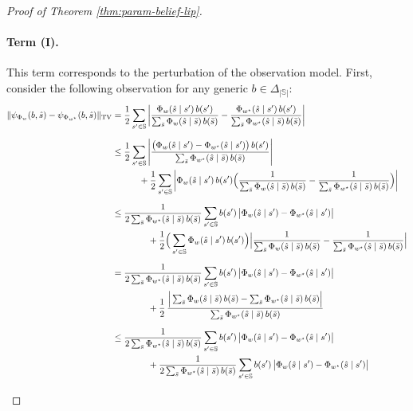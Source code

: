 \documentclass[10pt]{article} %
\theoremstyle{plain}
\theoremstyle{definition}
\theoremstyle{remark}
\newcommand{\bS}{\mathbb{S}}
\begin{document}
\begin{proof}[Proof of Theorem \ref{thm:param-belief-lip}]
\medskip
\noindent
\paragraph{Term (I).} This term corresponds to the perturbation of the observation model. First, consider the following observation for any generic \(b\in\Delta_{|\bS|}\):
\begin{align}\label{eq:bayes-op-param-perturb}
\|\psi_{\Phi_w}(b,\hat{s}) - \psi_{\Phi_{w^\star}}(b,\hat{s})\|_{\mathrm{TV}}
&=\frac12\sum_{s'\in\bS}\left|
\frac{\Phi_w(\hat s\mid s')\,b(s')}{\sum_{\bar s}\Phi_w(\hat s\mid \bar s)\,b(\bar s)}
-\frac{\Phi_{w^\star}(\hat s\mid s')\,b(s')}{\sum_{\bar s}\Phi_{w^\star}(\hat s\mid \bar s)\,b(\bar s)}
\right|\notag\\[6pt]
&\le \frac12\sum_{s'\in\bS}\left|
\frac{\bigl(\Phi_w(\hat s\mid s')-\Phi_{w^\star}(\hat s\mid s')\bigr)\,b(s')}{\sum_{\bar s}\Phi_{w^\star}(\hat s\mid \bar s)\,b(\bar s)}
\right|\notag\\
&\qquad\quad+\frac12\sum_{s'\in\bS}\left|
\Phi_w(\hat s\mid s')\,b(s')\Big(\frac{1}{\sum_{\bar s}\Phi_w(\hat s\mid \bar s)\,b(\bar s)} -\frac{1}{\sum_{\bar s}\Phi_{w^\star}(\hat s\mid \bar s)\,b(\bar s)}\Big)
\right|\notag\\[6pt]
&\le \frac{1}{2\sum_{\bar s}\Phi_{w^\star}(\hat s\mid \bar s)\,b(\bar s)}
\sum_{s'\in\bS} b(s')\,\bigl|\Phi_w(\hat s\mid s')-\Phi_{w^\star}(\hat s\mid s')\bigr|\notag\\
&\qquad\qquad+\frac12\Big(\sum_{s'\in\bS}\Phi_w(\hat s\mid s')\,b(s')\Big)
\Big|\frac{1}{\sum_{\bar s}\Phi_w(\hat s\mid \bar s)\,b(\bar s)}
-\frac{1}{\sum_{\bar s}\Phi_{w^\star}(\hat s\mid \bar s)\,b(\bar s)}\Big|\notag\\[6pt]
&= \frac{1}{2\sum_{\bar s}\Phi_{w^\star}(\hat s\mid \bar s)\,b(\bar s)}
\sum_{s'\in\bS} b(s')\,\bigl|\Phi_w(\hat s\mid s')-\Phi_{w^\star}(\hat s\mid s')\bigr|\notag\\
&\qquad\qquad
+\frac12\,\frac{\Big|\sum_{\bar s}\Phi_w(\hat s\mid \bar s)\,b(\bar s)
-\sum_{\bar s}\Phi_{w^\star}(\hat s\mid \bar s)\,b(\bar s)\Big|}
{\sum_{\bar s}\Phi_{w^\star}(\hat s\mid \bar s)\,b(\bar s)}\notag\\[6pt]
&\le \frac{1}{2\sum_{\bar s}\Phi_{w^\star}(\hat s\mid \bar s)\,b(\bar s)}
\sum_{s'\in\bS} b(s')\,\bigl|\Phi_w(\hat s\mid s')-\Phi_{w^\star}(\hat s\mid s')\bigr|\notag\\
&\qquad\qquad
+\frac{1}{2\sum_{\bar s}\Phi_{w^\star}(\hat s\mid \bar s)\,b(\bar s)}
\sum_{s'\in\bS} b(s')\,\bigl|\Phi_w(\hat s\mid s')-\Phi_{w^\star}(\hat s\mid s')\bigr|\notag\\[6pt]

\end{align}
\end{proof}
\end{document}
